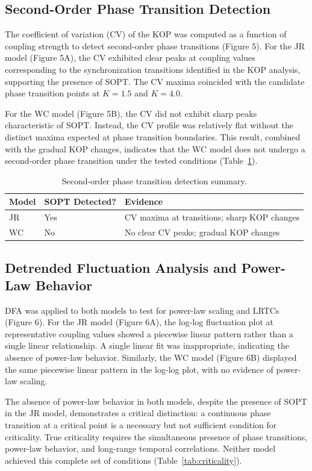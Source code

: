 \documentclass[12pt]{article}
\begin{document}
\subsection{Second-Order Phase Transition Detection}

The coefficient of variation (CV) of the KOP was computed as a function of coupling strength to detect second-order phase transitions (Figure 5). For the JR model (Figure 5A), the CV exhibited clear peaks at coupling values corresponding to the synchronization transitions identified in the KOP analysis, supporting the presence of SOPT. The CV maxima coincided with the candidate phase transition points at $K = 1.5$ and $K = 4.0$.

For the WC model (Figure 5B), the CV did not exhibit sharp peaks characteristic of SOPT. Instead, the CV profile was relatively flat without the distinct maxima expected at phase transition boundaries. This result, combined with the gradual KOP changes, indicates that the WC model does not undergo a second-order phase transition under the tested conditions (Table~\ref{tab:sopt}).

\begin{table}[H]
\centering
\caption{Second-order phase transition detection summary.}
\label{tab:sopt}
\begin{tabular}{lll}
\toprule
Model & SOPT Detected? & Evidence \\
\midrule
JR & Yes & CV maxima at transitions; sharp KOP changes \\
WC & No & No clear CV peaks; gradual KOP changes \\
\bottomrule
\end{tabular}
\end{table}

\subsection{Detrended Fluctuation Analysis and Power-Law Behavior}

DFA was applied to both models to test for power-law scaling and LRTCs (Figure 6). For the JR model (Figure 6A), the log-log fluctuation plot at representative coupling values showed a piecewise linear pattern rather than a single linear relationship. A single linear fit was inappropriate, indicating the absence of power-law behavior. Similarly, the WC model (Figure 6B) displayed the same piecewise linear pattern in the log-log plot, with no evidence of power-law scaling.

The absence of power-law behavior in both models, despite the presence of SOPT in the JR model, demonstrates a critical distinction: a continuous phase transition at a critical point is a necessary but not sufficient condition for criticality. True criticality requires the simultaneous presence of phase transitions, power-law behavior, and long-range temporal correlations. Neither model achieved this complete set of conditions (Table~\ref{tab:criticality}).
\end{document}
